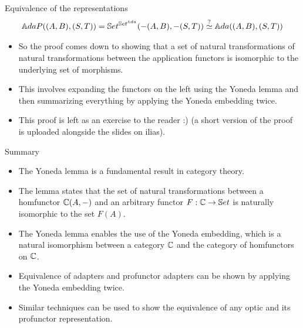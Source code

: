 \fi
\begin{frame}{Equivalence of the representations}
	\begin{align*}
		\mathbb{A}daP ((A,B),(S,T)) = \mathbb{S}et^{\mathbb{S}et^{\mathbb{A}da}}(-(A, B), -(S, T)) \overset{?}{\simeq} {\mathbb{A}da}((A,B), (S,T))
	\end{align*}
	\begin{itemize}
		\pause\item So the proof comes down to showing that a set of natural transformations of natural transformations between the application functors is isomorphic to the underlying set of morphisms.
		\pause\item This involves expanding the functors on the left using the Yoneda lemma and then summarizing everything by applying the Yoneda embedding twice.
		\pause\item This proof is left as an exercise to the reader :) \pause(a short version of the proof is uploaded alongside the slides on ilias).
	\end{itemize}
\end{frame}
\begin{frame}{Summary}
	\begin{itemize}
		\item The Yoneda lemma is a fundamental result in category theory.
		\pause\item The lemma states that the set of natural transformations between a homfunctor $\mathbb{C}(A, -)$ and an arbitrary functor $F : \mathbb{C} \to \mathbb{S}et$ is naturally isomorphic to the set $F(A)$.
		\pause\item The Yoneda lemma enables the use of the Yoneda embedding, which is a natural isomorphism between a category $\mathbb{C}$ and the category of homfunctors on $\mathbb{C}$.
		\pause\item Equivalence of adapters and profunctor adapters can be shown by applying the Yoneda embedding twice.
		\pause\item Similar techniques can be used to show the equivalence of any optic and its profunctor representation.
	\end{itemize}
\end{frame}